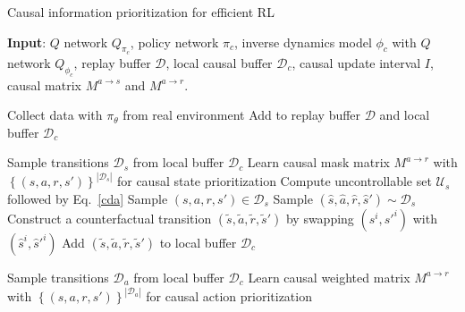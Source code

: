 \begin{algorithm}[h]
\footnotesize
    \caption{Causal information prioritization for efficient RL}
    \label{alg:algorithm1}
    \textbf{Input}: $Q$ network $Q_{\pi_c}$, policy network $\pi_{c}$, inverse dynamics model $\phi_c$ with $Q$ network $Q_{\phi_c}$, replay buffer $\mathcal{D}$, local causal buffer $\mathcal{D}_c$, causal update interval $I$, causal matrix $M^{a \to s}$ and $M^{a \to r}$. 
    
    \begin{algorithmic}[]
    \STATE Collect data with $\pi_{\theta}$ from real environment
    \STATE Add to replay buffer $\mathcal{D}$ and local buffer $\mathcal{D}_c$ 

    \ENDFOR
    \begin{tcolorbox}[colback=black!0!white,colframe=white!50!black,title=Step 1: Counterfactual data augmentation]
     \STATE Sample transitions $\mathcal{D}_s$ from local buffer $\mathcal{D}_c$
     \STATE Learn causal mask matrix $M^{a \to r}$ with $\left\{(s, a, r, s')\right\}^{|\mathcal{D}_s|}$ for causal state prioritization
     \STATE Compute uncontrollable set $\mathcal{U}_s$ followed by Eq.~\ref{cda}
     \STATE Sample $(s, a, r, s') \in \mathcal{D}_s$
     \STATE Sample $(\hat{s}, \hat{a}, \hat{r}, \hat{s}') \sim \mathcal{D}_s$
     \STATE Construct a counterfactual transition $(\tilde{s}, \tilde{a}, \tilde{r}, \tilde{s}')$ by swapping $(s^i, s'^{i})$ with $(\hat{s}^i, \hat{s}'^{i})$
     \STATE Add $(\tilde{s}, \tilde{a}, \tilde{r}, \tilde{s}')$ to local buffer $\mathcal{D}_c$
     \ENDIF
     \ENDFOR
     \ENDIF
     \end{tcolorbox} 

      \begin{tcolorbox}[colback=orange!0!white,colframe=orange!60!black,title=Step 2: Causal weighted matrix learning]
     \STATE Sample transitions $\mathcal{D}_a$ from local buffer $\mathcal{D}_c$  
     \STATE Learn causal weighted matrix $M^{a \to r}$ with $\left\{(s, a, r, s')\right\}^{|\mathcal{D}_a|}$ for causal action prioritization
     \ENDIF
    \end{tcolorbox}


\end{algorithmic}
\end{algorithm}
